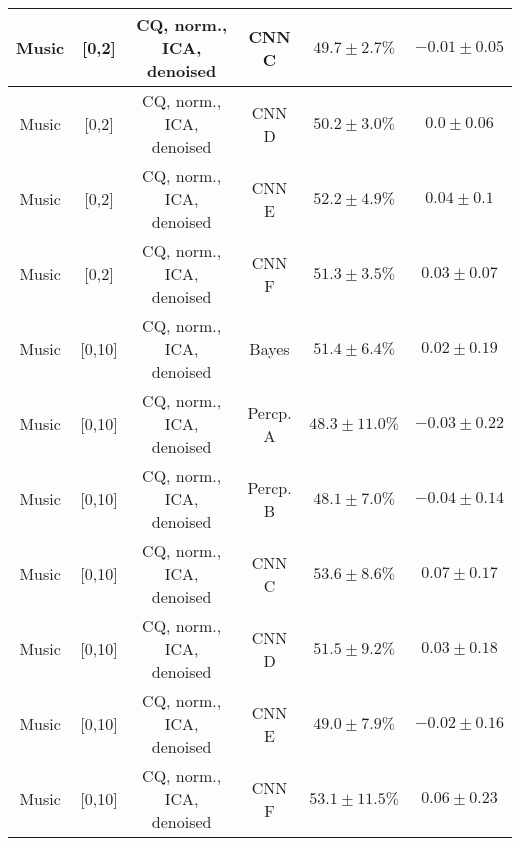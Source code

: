 \begin{table}[!htb]
{\begin{tabular}{c|c|c|c|c|c}
    \hline
    Music               & [0,2]                                         & \scriptsize{CQ, norm., ICA, denoised}      & CNN C                 &  $49.7 \pm 2.7\%$     & $-0.01 \pm 0.05$\\ 
    \hline
    Music               & [0,2]                                         & \scriptsize{CQ, norm., ICA, denoised}      & CNN D                 &  $50.2 \pm 3.0\%$     & $0.0 \pm 0.06$\\   
    \hline
    Music               & [0,2]                                         & \scriptsize{CQ, norm., ICA, denoised}      & CNN E                 &  $52.2 \pm 4.9\%$     & $0.04 \pm 0.1$\\   
    \hline
    Music               & [0,2]                                         & \scriptsize{CQ, norm., ICA, denoised}      & CNN F                 &  $51.3 \pm 3.5\%$     & $0.03 \pm 0.07$\\  
    \hline
    Music               & [0,10]                                        & \scriptsize{CQ, norm., ICA, denoised}      & Bayes                 &  $51.4 \pm 6.4\%$     & $0.02 \pm 0.19$\\ 
    \hline
    Music               & [0,10]                                        & \scriptsize{CQ, norm., ICA, denoised}      & Percp. A              &  $48.3 \pm 11.0\%$    & $-0.03 \pm 0.22$\\ 
    \hline
    Music               & [0,10]                                        & \scriptsize{CQ, norm., ICA, denoised}      & Percp. B              &  $48.1 \pm 7.0\%$     & $-0.04 \pm 0.14$\\  
    \hline
    Music               & [0,10]                                        & \scriptsize{CQ, norm., ICA, denoised}      & CNN C                 &  $53.6 \pm 8.6\%$     & $0.07 \pm 0.17$\\  
    \hline
    Music               & [0,10]                                        & \scriptsize{CQ, norm., ICA, denoised}      & CNN D                 &  $51.5 \pm 9.2\%$     & $0.03 \pm 0.18$\\   
    \hline
    Music               & [0,10]                                        & \scriptsize{CQ, norm., ICA, denoised}      & CNN E                 &  $49.0 \pm 7.9\%$     & $-0.02 \pm 0.16$\\ 
    \hline
    Music               & [0,10]                                        & \scriptsize{CQ, norm., ICA, denoised}      & CNN F                 &  $53.1 \pm 11.5\%$    & $0.06 \pm 0.23$\\   

\end{tabular}}
\end{table}
